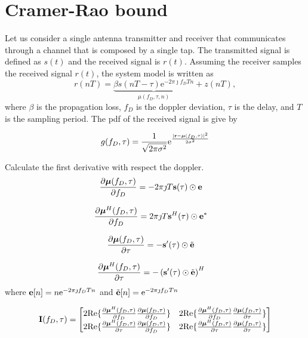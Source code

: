 \documentclass[12pt,a4paper,twoside,english]{article}
\begin{document}
	
\section{Cramer-Rao bound}	
	Let us consider a single antenna transmitter and receiver that communicates through a channel that is composed by a single tap. The transmitted signal is defined as $s(t)$ and the received signal is $r(t)$. Assuming the receiver samples the received signal $r(t)$, the system model is written as
	\begin{equation}
		r(nT) = \underbrace{\beta s(nT - \tau)\textrm{e}^{-2\pi \jmath f_DT n}}_{\mu (f_D,\tau,n)} + z(nT),
	\end{equation}
where $\beta$ is the propagation loss, $f_D$ is the doppler deviation, $\tau$ is the delay, and $T$ is the sampling period. The pdf of the received signal is give by

\begin{equation}
  g(f_D,\tau) = \frac{1}{\sqrt{2\pi \sigma ^2}}\textrm{e}^{\frac{| \mathbf{r} - \bm{\mu} (f_D,\tau)|^2}{2\sigma^2}}
\end{equation}

Calculate the first derivative with respect the doppler.
\begin{align}\label{eq.: doppler_first}
  \frac{\partial \bm{\mu} (f_D,\tau)}{\partial f_D} & = -2\pi \jmath T \mathbf{s} (\tau) \odot \mathbf{e}
\end{align}

\begin{align}\label{eq.: doppler_first_conj}
  \frac{\partial \bm{\mu}^H(f_D,\tau)}{\partial f_D} & = 2\pi \jmath T \mathbf{s}^{H} (\tau)\odot \mathbf{e}^{*}
\end{align}

\begin{align}\label{eq.: tau_first}
  \frac{\partial \bm{\mu} (f_D,\tau)}{\partial \tau} & = -\mathbf{s}^{\prime} (\tau)\odot \tilde{\mathbf{e}}
\end{align}


\begin{align}\label{eq.: tau_first_conj}
  \frac{\partial \bm{\mu}^{H} (f_D,\tau)}{\partial \tau} & = -\left(\mathbf{s}^{\prime}(\tau) \odot  \tilde{\mathbf{e}} \right)^{H} 
\end{align}
where $\mathbf{e}[n] = n\textrm{e}^{-2\pi \jmath f_DT n}$ and $\tilde{\mathbf{e}}[n] = \textrm{e}^{-2\pi \jmath f_DT n}$

\[  \mathbf{I}(f_D,\tau) = 
  \begin{bmatrix}
   2\textrm{Re}\{ \frac{\partial \bm{\mu}^H(f_D,\tau)}{\partial
      f_D} \frac{\partial \bm{\mu} (f_D,\tau)}{\partial f_D} \} & 2\textrm{Re}\{\frac{\partial
      \bm{\mu}^H(f_D,\tau)}{\partial f_D}\frac{\partial \bm{\mu}
      (f_D,\tau)}{\partial \tau}  \} \\
     2\textrm{Re}\{ \frac{\partial \bm{\mu}^H(f_D,\tau)}{\partial
      \tau} \frac{\partial \bm{\mu} (f_D,\tau)}{\partial f_D} \} & 2\textrm{Re}\{\frac{\partial
      \bm{\mu}^H(f_D,\tau)}{\partial \tau}\frac{\partial \bm{\mu}
      (f_D,\tau)}{\partial \tau}  \} \\
  \end{bmatrix}
\]
\end{document}
